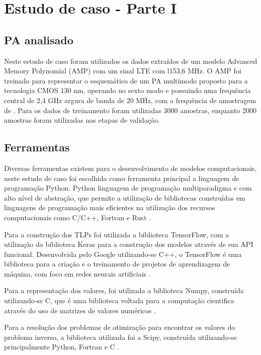 \chapter{Estudo de caso - Parte I} \label{cha:estudoi}

\section{PA analisado} \label{sec:estudoi-pa}
Neste estudo de caso foram utilizados os dados extraídos de um modelo Advanced Memory Polynomial (AMP) com um sinal LTE com l153,6 MHz. O AMP foi treinado para representar o esquemático de um PA multímodo proposto para a tecnologia CMOS 130 nm, operando no sexto modo e possuindo uma frequência central de 2,4 GHz argura de banda de 20 MHz, com a frequência de amostragem de \cite{dos2017fully} \cite{schuartz2019reduced}. Para os dados de treinamento foram utilizadas 3000 amostras, enquanto 2000 amostras foram utilizadas nas etapas de validação.

\section{Ferramentas} \label{sec:estudoi-ferr}
Diversas ferramentas existem para o desenvolvimento de modelos computacionais, neste estudo de caso foi escolhida como ferramenta principal a linguagem de programação Python. Python linguagem de programação multiparadigma e com alto nível de abstração, que permite a utilização de bibliotecas construídas em linguagens de programação mais eficientes na utilização dos recursos computacionais como C/C++, Fortran e Rust \cite{Ramalho2022-zg}.

Para a construção dos TLPs foi utilizada a biblioteca TensorFlow, com a utilização da biblioteca Keras para a construção dos modelos através de sua API funcional. Desenvolvida pelo Google utilizando-se C++, o TensorFlow é uma biblioteca para a criação e o treinamento de projetos de aprendizagem de máquina, com foco em redes neurais artificiais \cite{tensorflow2015-whitepaper}.

Para a representação dos valores, foi utilizada a biblioteca Numpy, construída utilizando-se C, que é uma biblioteca voltada para a computação cientifica através do uso de matrizes de valores numéricos \cite{harris2020array}.

Para a resolução dos problemas de otimização para encontrar os valores do problema inverso, a biblioteca utilizada foi a Scipy, construída utilizando-se principalmente Python, Fortran e C \cite{2020SciPy-NMeth}.

